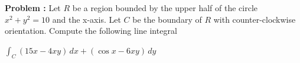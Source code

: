 {\bf Problem :} Let $R$ be a region bounded by the upper half of the circle $x^2+y^2=10$ and the x-axis.  Let $C$ be the boundary of $R$ with counter-clockwise orientation.  Compute the following line integral 
\par 
\(\int_{C} (15x-4xy) \, dx + (\cos x-6xy) \, dy\) 

